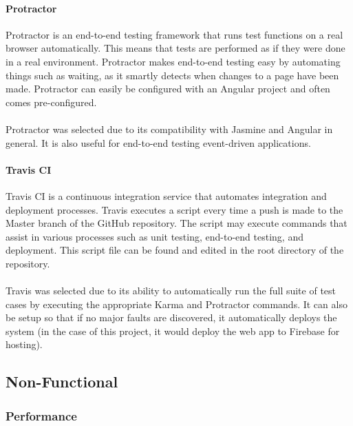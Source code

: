 \documentclass[a4paper, 11pt]{article}
\begin{document}
            \paragraph{Protractor}
            Protractor is an end-to-end testing framework that runs test functions on a real browser automatically. This means that tests are performed as if they were done in a real environment. Protractor makes end-to-end testing easy by automating things such as waiting, as it smartly detects when changes to a page have been made. Protractor can easily be configured with an Angular project and often comes pre-configured.
            \paragraph{}
            Protractor was selected due to its compatibility with Jasmine and Angular in general. It is also useful for end-to-end testing event-driven applications.
            
            \paragraph{Travis CI}
            Travis CI is a continuous integration service that automates integration and deployment processes. Travis executes a script every time a push is made to the Master branch of the GitHub repository. The script may execute commands that assist in various processes such as unit testing, end-to-end testing, and deployment. This script file can be found and edited in the root directory of the repository.
            \paragraph{}
            Travis was selected due to its ability to automatically run the full suite of test cases by executing the appropriate Karma and Protractor commands. It can also be setup so that if no major faults are discovered, it automatically deploys the system (in the case of this project, it would deploy the web app to Firebase for hosting).
            
    \subsection{Non-Functional}
        \subsubsection{Performance}
        
\end{document}

